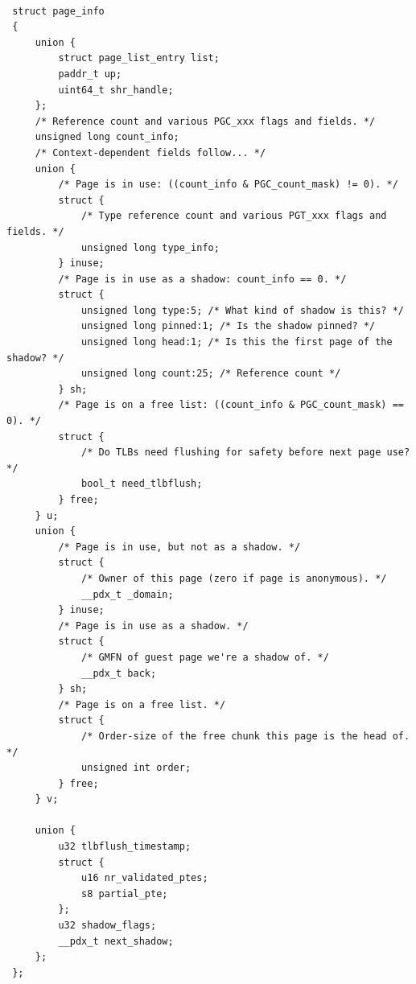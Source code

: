 \smallskip
\begin{lstlisting}

 struct page_info
 {
     union {
         struct page_list_entry list;
         paddr_t up;
         uint64_t shr_handle;
     };
     /* Reference count and various PGC_xxx flags and fields. */
     unsigned long count_info;
     /* Context-dependent fields follow... */
     union {
         /* Page is in use: ((count_info & PGC_count_mask) != 0). */
         struct {
             /* Type reference count and various PGT_xxx flags and fields. */
             unsigned long type_info;
         } inuse;
         /* Page is in use as a shadow: count_info == 0. */
         struct {
             unsigned long type:5; /* What kind of shadow is this? */
             unsigned long pinned:1; /* Is the shadow pinned? */
             unsigned long head:1; /* Is this the first page of the shadow? */
             unsigned long count:25; /* Reference count */
         } sh;
         /* Page is on a free list: ((count_info & PGC_count_mask) == 0). */
         struct {
             /* Do TLBs need flushing for safety before next page use? */
             bool_t need_tlbflush;
         } free;
     } u;
     union {
         /* Page is in use, but not as a shadow. */
         struct {
             /* Owner of this page (zero if page is anonymous). */
             __pdx_t _domain;
         } inuse;
         /* Page is in use as a shadow. */
         struct {
             /* GMFN of guest page we're a shadow of. */
             __pdx_t back;
         } sh;
         /* Page is on a free list. */
         struct {
             /* Order-size of the free chunk this page is the head of. */
             unsigned int order;
         } free;
     } v;

     union {
         u32 tlbflush_timestamp;
         struct {
             u16 nr_validated_ptes;
             s8 partial_pte;
         };
         u32 shadow_flags;
         __pdx_t next_shadow;
     };
 }; 


\end{lstlisting}
 
